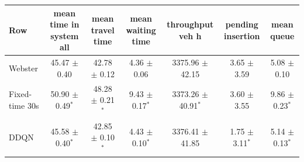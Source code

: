 \begin{tabular}{lcccccc}
\toprule
Row & mean time in system all & mean travel time & mean waiting time & throughput veh h & pending insertion & mean queue \\
\midrule
Webster & 45.47 $\pm$ 0.40 & 42.78 $\pm$ 0.12 & 4.36 $\pm$ 0.06 & 3375.96 $\pm$ 42.15 & 3.65 $\pm$ 3.59 & 5.08 $\pm$ 0.10 \\
Fixed-time 30s & 50.90 $\pm$ 0.49$^{*}$ & 48.28 $\pm$ 0.21$^{*}$ & 9.43 $\pm$ 0.17$^{*}$ & 3373.26 $\pm$ 40.91$^{*}$ & 3.60 $\pm$ 3.55 & 9.86 $\pm$ 0.23$^{*}$ \\
DDQN & 45.58 $\pm$ 0.40$^{*}$ & 42.85 $\pm$ 0.10$^{*}$ & 4.43 $\pm$ 0.10$^{*}$ & 3376.41 $\pm$ 41.85 & 1.75 $\pm$ 3.11$^{*}$ & 5.14 $\pm$ 0.13$^{*}$ \\
\bottomrule
\end{tabular}
